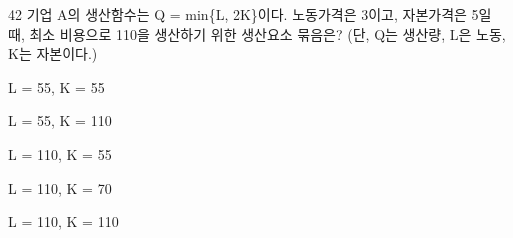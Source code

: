 \begin{question}{42}
기업 A의 생산함수는 Q = min\{L, 2K\}이다. 노동가격은 3이고, 자본가격은 5일 때, 최소 비용으로 110을 생산하기 위한 생산요소 묶음은? (단, Q는 생산량, L은 노동, K는 자본이다.)
\begin{choices}
  \item L = 55, K = 55
  \item L = 55, K = 110
  \item L = 110, K = 55
  \item L = 110, K = 70
  \item L = 110, K = 110
\end{choices}
\end{question}
